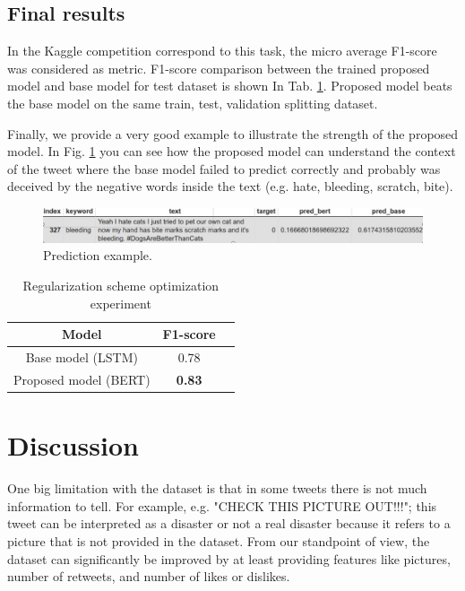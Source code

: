 \documentclass[sigconf]{acmart}
\begin{document}
\subsection{Final results}
In the Kaggle competition correspond to this task, the micro average F1-score was considered as metric. F1-score comparison between the trained proposed model and base model for test dataset is shown In Tab. \ref{tab:result}. Proposed model beats the base model on the same train, test, validation splitting dataset. 

Finally, we provide a very good example to illustrate the strength of the proposed model. In Fig. \ref{fig:pred} you can see how the proposed model can understand the context of the tweet where the base model failed to predict correctly and probably was deceived by the negative words inside the text (e.g. hate, bleeding, scratch, bite).  


\begin{figure}[h]
  \centering
  \includegraphics[width=\linewidth]{pred.png}
  \caption{Prediction example.}
  \label{fig:pred}
\end{figure}



\begin{table}
  \caption{Regularization scheme optimization experiment}
  \label{tab:result}
  \begin{tabular}{ccl}
    \toprule
    Model&F1-score\\
    \midrule
    Base model (LSTM) &0.78\\ 
    Proposed model (BERT)  &\textbf{0.83}\\ 
  \bottomrule
\end{tabular}
\end{table}

\section{Discussion}

One big limitation with the dataset is that in some tweets there is not much information to tell. For example, e.g. "CHECK THIS PICTURE OUT!!!"; this tweet can be interpreted as a disaster or not a real disaster because it refers to a picture that is not provided in the dataset. From our standpoint of view, the dataset can significantly be improved by at least providing features like pictures, number of retweets, and number of likes or dislikes.
\end{document}
